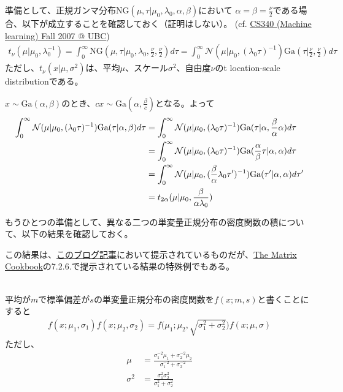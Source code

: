 \documentclass[aspectratio=169,unicode,dvipdfmx,14pt]{beamer}
\begin{document}
\begin{frame}
\FontMath
準備として、正規ガンマ分布$\mbox{NG}(\mu,\tau|\mu_0, \lambda_0, \alpha, \beta)$において
$\alpha=\beta=\frac{\nu}{2}$である場合、以下が成立することを確認しておく（証明はしない）。
(cf. \href{https://www.cs.ubc.ca/~murphyk/Teaching/CS340-Fall07/reading/NG.pdf}{CS340 (Machine learning) Fall 2007 @ UBC})
\begin{align}
t_\nu (\mu|\mu_0,\lambda_0^{-1}) = \int_0^\infty \mbox{NG}(\mu,\tau|\mu_0, \lambda_0, \frac{\nu}{2}, \frac{\nu}{2}) d\tau
= \int_0^\infty \mathcal{N}(\mu|\mu_0,(\lambda_0\tau)^{-1})\mbox{Ga}(\tau|\frac{\nu}{2},\frac{\nu}{2}) d\tau
\end{align}
ただし、$t_\nu (x|\mu,\sigma^2)$は、平均$\mu$、スケール$\sigma^2$、自由度$\nu$のt location-scale distributionである。

$x \sim \mbox{Ga}(\alpha,\beta)$のとき、$cx \sim \mbox{Ga}(\alpha,\frac{\beta}{c})$となる。よって
\begin{align}
\int_0^\infty \mathcal{N}(\mu|\mu_0,(\lambda_0\tau)^{-1})\mbox{Ga}(\tau|\alpha,\beta) d\tau
& = \int_0^\infty \mathcal{N}(\mu|\mu_0,(\lambda_0\tau)^{-1})\mbox{Ga}(\tau|\alpha,\frac{\beta}{\alpha}\alpha) d\tau
\notag \\ & =
\int_0^\infty \mathcal{N}(\mu|\mu_0,(\lambda_0\tau)^{-1})\mbox{Ga}(\frac{\alpha}{\beta}\tau|\alpha,\alpha) d\tau
\notag \\ & =
\int_0^\infty \mathcal{N}(\mu|\mu_0,(\frac{\beta}{\alpha}\lambda_0\tau^\prime)^{-1})\mbox{Ga}(\tau^\prime|\alpha,\alpha) d\tau^\prime
\notag \\ & =
t_{2\alpha}(\mu|\mu_0,\frac{\beta}{\alpha\lambda_0})
\label{eq:t-dist}
\end{align}
\end{frame}

\begin{frame}
\FontMath
もうひとつの準備として、異なる二つの単変量正規分布の密度関数の積について、以下の結果を確認しておく。

この結果は、\href{https://www.johndcook.com/blog/2012/10/29/product-of-normal-pdfs/}{このブログ記事}において提示されているものだが、\href{https://www.ics.uci.edu/~welling/teaching/KernelsICS273B/MatrixCookBook.pdf}{The Matrix Cookbook}の7.2.6.で提示されている結果の特殊例でもある。

\ \\
平均が$m$で標準偏差が$s$の単変量正規分布の密度関数を$f(x;m,s)$と書くことにすると
\begin{align}
f(x;\mu_1,\sigma_1)f(x;\mu_2,\sigma_2) 
= f\Big(\mu_1;\mu_2,\sqrt{\sigma_1^2+\sigma_2^2}\Big) f(x;\mu,\sigma)
\end{align}
ただし、
\begin{align}
\mu & =\frac{\sigma_1^{-2}\mu_1 + \sigma_2^{-2}\mu_2}{\sigma_1^{-2} + \sigma_2^{-2}} \\
\sigma^2 &= \frac{\sigma_1^2\sigma_2^2}{\sigma_1^2 + \sigma_2^2}
\end{align}
\end{frame}
\end{document}
